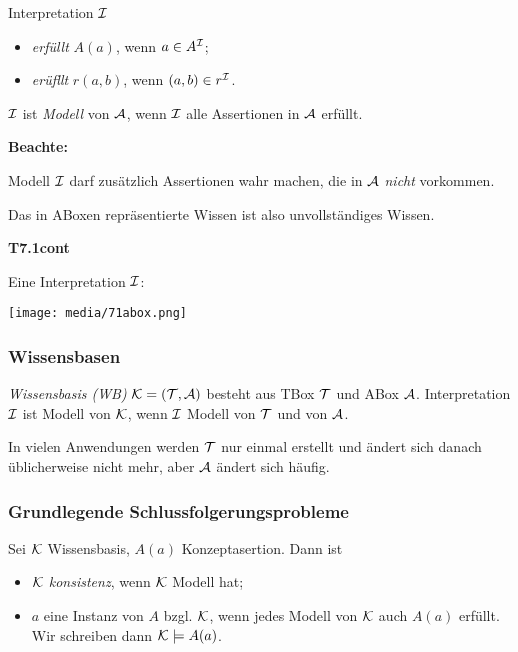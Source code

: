 \begin{definition}

Interpretation $\mathcal{I}$

\begin{itemize}
	\item \emph{erfüllt} $A(a)$, wenn $a \in A^{\mathcal{I}}$;
	\item \emph{erüfllt} $r(a,b)$, wenn $(a,b) \in r^{\mathcal{I}}$.
\end{itemize}

$\mathcal{I}$ ist \emph{Modell} von $\mathcal{A}$, wenn $\mathcal{I}$ alle Assertionen in $\mathcal{A}$ erfüllt.
\end{definition}

\textbf{Beachte:}

Modell $\mathcal{I}$ darf zusätzlich Assertionen wahr machen, die in $\mathcal{A}$ \emph{nicht} vorkommen.

Das in ABoxen repräsentierte Wissen ist also unvollständiges Wissen.

\textbf{T7.1cont}

Eine Interpretation $\mathcal{I}$:

\texttt{[image: media/71abox.png]}

\subsubsection{Wissensbasen}

\begin{definition}

\emph{Wissensbasis (WB)} $\mathcal{K} = (\mathcal{T} , \mathcal{A})$ besteht aus TBox $\mathcal{T}$ und ABox $\mathcal{A}$. Interpretation $\mathcal{I}$ ist Modell von $\mathcal{K}$, wenn $\mathcal{I}$ Modell von $\mathcal{T}$ und von $\mathcal{A}$.
\end{definition}

In vielen Anwendungen werden $\mathcal{T}$ nur einmal erstellt und ändert sich danach üblicherweise nicht mehr, aber $\mathcal{A}$ ändert sich häufig.

\subsubsection{Grundlegende Schlussfolgerungsprobleme}

\begin{definition}

Sei $\mathcal{K}$ Wissensbasis, $A(a)$ Konzeptasertion. Dann ist

\begin{itemize}
	\item $\mathcal{K}$ \emph{konsistenz}, wenn $\mathcal{K}$ Modell hat;
	\item $a$ eine Instanz von $A$ bzgl. $\mathcal{K}$, wenn jedes Modell von $\mathcal{K}$ auch $A(a)$ erfüllt. Wir schreiben dann $\mathcal{K} \models A(a)$.
\end{itemize}
\end{definition}

